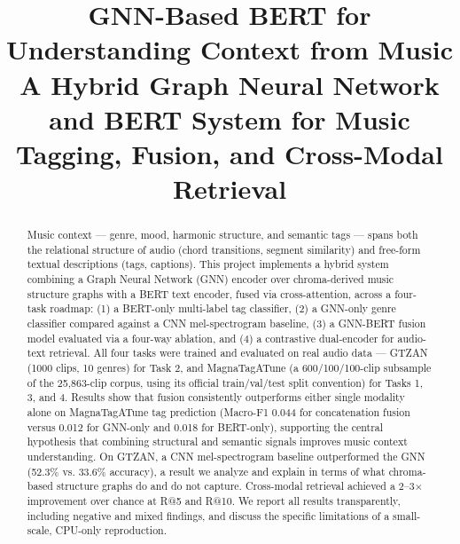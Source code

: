 \documentclass[conference]{IEEEtran}
\begin{document}
\title{GNN-Based BERT for Understanding Context from Music\\
\large A Hybrid Graph Neural Network and BERT System for Music Tagging, Fusion, and Cross-Modal Retrieval}

\author{
}

\maketitle

\begin{abstract}
Music context --- genre, mood, harmonic structure, and semantic tags --- spans both the relational structure of audio (chord transitions, segment similarity) and free-form textual descriptions (tags, captions). This project implements a hybrid system combining a Graph Neural Network (GNN) encoder over chroma-derived music structure graphs with a BERT text encoder, fused via cross-attention, across a four-task roadmap: (1) a BERT-only multi-label tag classifier, (2) a GNN-only genre classifier compared against a CNN mel-spectrogram baseline, (3) a GNN-BERT fusion model evaluated via a four-way ablation, and (4) a contrastive dual-encoder for audio-text retrieval. All four tasks were trained and evaluated on real audio data --- GTZAN (1000 clips, 10 genres) for Task 2, and MagnaTagATune (a 600/100/100-clip subsample of the 25{,}863-clip corpus, using its official train/val/test split convention) for Tasks 1, 3, and 4. Results show that fusion consistently outperforms either single modality alone on MagnaTagATune tag prediction (Macro-F1 0.044 for concatenation fusion versus 0.012 for GNN-only and 0.018 for BERT-only), supporting the central hypothesis that combining structural and semantic signals improves music context understanding. On GTZAN, a CNN mel-spectrogram baseline outperformed the GNN (52.3\% vs. 33.6\% accuracy), a result we analyze and explain in terms of what chroma-based structure graphs do and do not capture. Cross-modal retrieval achieved a 2--3$\times$ improvement over chance at R@5 and R@10. We report all results transparently, including negative and mixed findings, and discuss the specific limitations of a small-scale, CPU-only reproduction.
\end{abstract}
\end{document}
